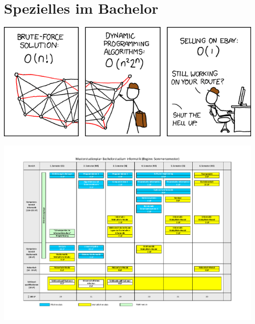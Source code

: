 \documentclass[]{papertex}
\begin{document}
	\section{Spezielles im Bachelor}
		\label{bachelor}
		
		
		\newpage
		\begin{multicols}{2}
		
		
		\end{multicols}
		\begin{center}
		\includegraphics[totalheight=6cm]{bilder/XKCD/travelling_salesman}
		\end{center}
		\begin{minipage}{1.0\linewidth}
			\begin{center}     
			\label{musterstudienplan}
			\includegraphics[angle=90, totalheight=\textheight, width=\textwidth ]{bilder/studienplan_bsc_ss/Musterstudienplan_BScInformatik_SS.pdf}
			\end{center}  
		\end{minipage}
		\newpage
\end{document}
